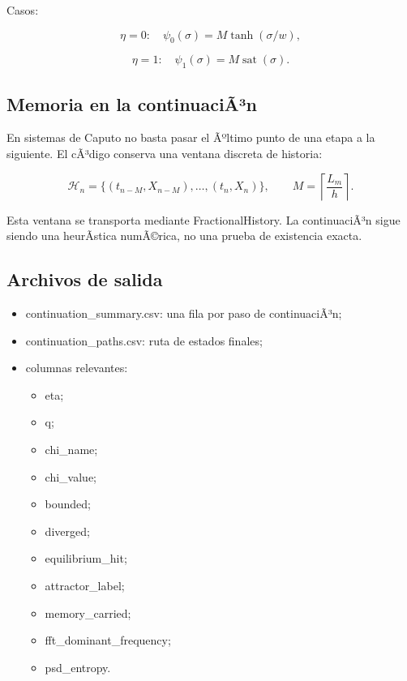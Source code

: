 \documentclass[11pt]{article}
\DeclareRobustCommand{\codepath}[1]{\begingroup\Urlmuskip=0mu plus 2mu\path{#1}\endgroup}
\def\codepath#1{#1}%
\begin{document}
Casos:

\begin{equation}
\eta=0:\quad \psi_0(\sigma)=M\tanh(\sigma/w),
\end{equation}

\begin{equation}
\eta=1:\quad \psi_1(\sigma)=M\operatorname{sat}(\sigma).
\end{equation}

\subsection{Memoria en la continuaciÃ³n}

En sistemas de Caputo no basta pasar el Ãºltimo punto de una etapa a la siguiente. El cÃ³digo conserva una ventana discreta de historia:

\begin{equation}
\mathcal H_n=
\{(t_{n-M},X_{n-M}),\ldots,(t_n,X_n)\},
\qquad
M=\left\lceil\frac{L_m}{h}\right\rceil.
\end{equation}

Esta ventana se transporta mediante \codepath{FractionalHistory}. La continuaciÃ³n sigue siendo una heurÃ­stica numÃ©rica, no una prueba de existencia exacta.

\subsection{Archivos de salida}

\begin{itemize}
\item \codepath{continuation_summary.csv}: una fila por paso de continuaciÃ³n;
\item \codepath{continuation_paths.csv}: ruta de estados finales;
\item columnas relevantes:
\begin{itemize}
\item \codepath{eta};
\item \codepath{q};
\item \codepath{chi_name};
\item \codepath{chi_value};
\item \codepath{bounded};
\item \codepath{diverged};
\item \codepath{equilibrium_hit};
\item \codepath{attractor_label};
\item \codepath{memory_carried};
\item \codepath{fft_dominant_frequency};
\item \codepath{psd_entropy}.
\end{itemize}
\end{itemize}
\end{document}
